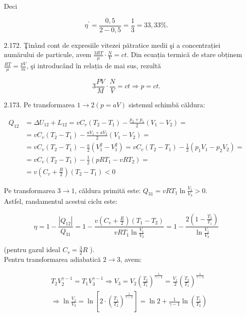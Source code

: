 \documentclass[10pt]{article}
\begin{document}
Deci

$$
\eta^{\prime}=\frac{0,5}{2-0,5}=\frac{1}{3}=33,33 \% .
$$

2.172. Ţinând cont de expresiile vitezei pătratice medii şi a concentrației numărului de particule, avem $\frac{3 R T}{\mu} \cdot \frac{N}{V}=c t$. Din ecuația termică de stare obținem $\frac{R T}{\mu}=\frac{p V}{m}$, şi introducând în relația de mai sus, rezultă

$$
3 \frac{P V}{M} \cdot \frac{N}{V}=c t \Rightarrow p=c t .
$$

2.173. Pe transformarea $1 \rightarrow 2(p=a V)$ sistemul schimbă căldura:

$$
\begin{aligned}
Q_{12} & =\Delta U_{12}+L_{12}=v C_{v}\left(T_{2}-T_{1}\right)-\frac{p_{2}+p_{1}}{2}\left(V_{1}-V_{2}\right)= \\
& =v C_{v}\left(T_{2}-T_{1}\right)-\frac{a V_{1}+a V_{2}}{2}\left(V_{1}-V_{2}\right)= \\
& =v C_{v}\left(T_{2}-T_{1}\right)-\frac{a}{2}\left(V_{1}^{2}-V_{1}^{2}\right)=v C_{v}\left(T_{2}-T_{1}\right)-\frac{1}{2}\left(p_{1} V_{1}-p_{2} V_{2}\right)= \\
& =v C_{v}\left(T_{2}-T_{1}\right)-\frac{1}{2}\left(p R T_{1}-v R T_{2}\right)= \\
& =v\left(C_{v}+\frac{R}{2}\right)\left(T_{2}-T_{1}\right)<0
\end{aligned}
$$

Pe transformarea $3 \rightarrow 1$, căldura primită este: $Q_{31}=v R T_{1} \ln \frac{V_{1}}{V_{3}}>0$.\\
Astfel, randamentul acestui ciclu este:

$$
\eta=1-\frac{\left|Q_{12}\right|}{Q_{31}}=1-\frac{v\left(C_{v}+\frac{R}{2}\right)\left(T_{1}-T_{2}\right)}{v R T_{1} \ln \frac{V_{1}}{V_{3}}}=1-\frac{2\left(1-\frac{T_{2}}{T_{1}}\right)}{\ln \frac{V_{1}}{V_{3}}}
$$

(pentru gazul ideal $C_{v}=\frac{3}{2} R$ ).\\
Pentru transformarea adiabatică $2 \rightarrow 3$, avem:

$$
\begin{aligned}
& T_{2} V_{2}^{\gamma-1}=T_{1} V_{3}^{\gamma-1} \Rightarrow V_{3}=V_{2}\left(\frac{T_{2}}{T_{1}}\right)^{\frac{1}{\gamma-1}}=\frac{V_{1}}{2}\left(\frac{T_{2}}{T_{1}}\right)^{\frac{1}{\gamma-1}} \\
& \Rightarrow \ln \frac{V_{1}}{V_{3}}=\ln \left[2 \cdot\left(\frac{T_{1}}{T_{2}}\right)^{\frac{1}{\gamma-1}}\right]=\ln 2+\frac{1}{\gamma-1} \ln \left(\frac{T_{1}}{T_{2}}\right)
\end{aligned}
$$
\end{document}
